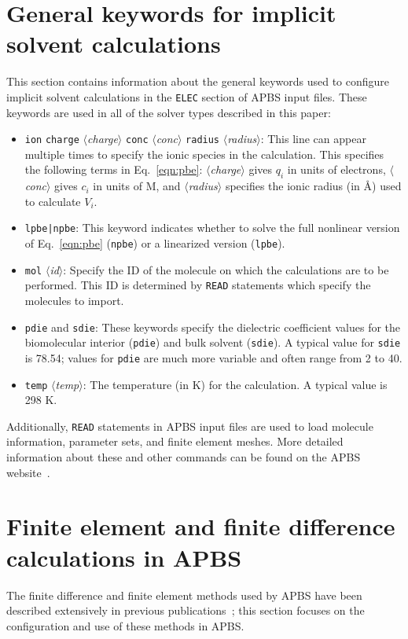 \documentclass[12pt,titlepage]{article}
\newcommand{\keyword}[1]{\texttt{#1}}
\newcommand{\param}[1]{$\langle$\textit{#1}$\rangle$}
\begin{document}
\section{General keywords for implicit solvent calculations} \label{app:general}
This section contains information about the general keywords used to configure implicit solvent calculations in the \keyword{ELEC} section of APBS input files.
These keywords are used in all of the solver types described in this paper:
\begin{itemize}
	\item \keyword{ion} \keyword{charge} \param{charge} \keyword{conc} \param{conc} \keyword{radius} \param{radius}:  This line can appear multiple times to specify the ionic species in the calculation.
	This specifies the following terms in Eq.~\ref{eqn:pbe}: \param{charge} gives $q_i$ in units of electrons, \param{conc} gives $c_i$ in units of M, and \param{radius} specifies the ionic radius (in \AA) used to calculate $V_i$.
	\item \keyword{lpbe|npbe}: This keyword indicates whether to solve the full nonlinear version of Eq.~\ref{eqn:pbe} (\keyword{npbe}) or a linearized version (\keyword{lpbe}).
	\item \keyword{mol} \param{id}:  Specify the ID of the molecule on which the calculations are to be performed.
	This ID is determined by \keyword{READ} statements which specify the molecules to import.
	\item \keyword{pdie} and \keyword{sdie}:  These keywords specify the di\-elec\-tric coefficient values for the bio\-mol\-ec\-ular interior (\keyword{pdie}) and bulk solvent (\keyword{sdie}).
	A typical value for \keyword{sdie} is 78.54; values for \keyword{pdie} are much more variable and often range from 2 to 40.
	\item \keyword{temp} \param{temp}:  The temperature (in K) for the calculation.  A typical value is 298 K.
\end{itemize}
Additionally, \keyword{READ} statements in APBS input files are used to load molecule information, parameter sets, and finite element meshes.
More detailed information about these and other commands can be found on the APBS website~\cite{APBSweb}.

\section{Finite element and finite difference calculations in APBS} \label{app:fd}
The finite difference and finite element methods used by APBS have been described extensively in previous publications~\cite{Baker2000, Holst2000, Holst1993, Baker2001, Baker2001a}; this section focuses on the configuration and use of these methods in APBS.
\end{document}
